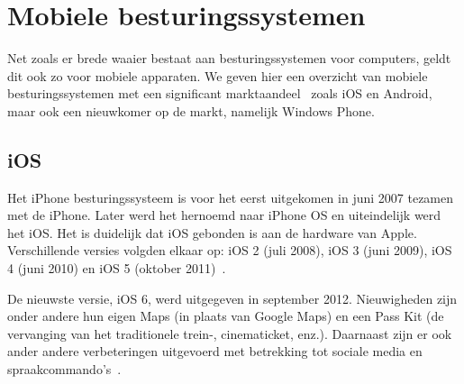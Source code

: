 




\section{Mobiele besturingssystemen}
\label{sec:mobiele-besturingssystemen}
Net zoals er brede waaier bestaat aan besturingssystemen voor computers, geldt dit ook zo voor mobiele apparaten. We geven hier een overzicht van mobiele besturingssystemen met een significant marktaandeel~\cite{David2011, Hales2012} zoals iOS en Android, maar ook een nieuwkomer op de markt, namelijk Windows Phone.

\subsection{iOS}
Het iPhone besturingssysteem is voor het eerst uitgekomen in juni 2007 tezamen met de iPhone. Later werd het hernoemd naar iPhone OS en uiteindelijk werd het iOS. Het is duidelijk dat iOS gebonden is aan de hardware van Apple. Verschillende versies volgden elkaar op: iOS 2 (juli 2008), iOS 3 (juni 2009), iOS 4 (juni 2010) en iOS 5 (oktober 2011)~\cite{Deitel2012, PhilDutson2012}. 

De nieuwste versie, iOS 6, werd uitgegeven in september 2012. Nieuwigheden zijn onder andere hun eigen Maps (in plaats van Google Maps) en een Pass Kit (de vervanging van het traditionele trein-, cinematicket, enz.). Daarnaast zijn er ook ander andere verbeteringen uitgevoerd met betrekking tot sociale media en spraakcommando's~\cite{Deitel2012}.

